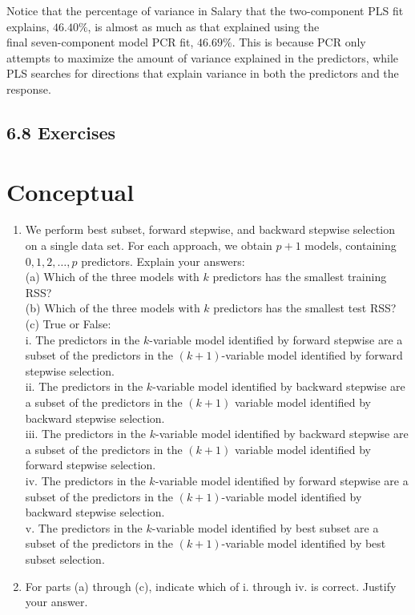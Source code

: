 \documentclass[10pt]{article}
\begin{document}
Notice that the percentage of variance in Salary that the two-component PLS fit explains, $46.40 \%$, is almost as much as that explained using the\\
final seven-component model PCR fit, $46.69 \%$. This is because PCR only attempts to maximize the amount of variance explained in the predictors, while PLS searches for directions that explain variance in both the predictors and the response.

\subsection*{6.8 Exercises}
\section*{Conceptual}
\begin{enumerate}
  \item We perform best subset, forward stepwise, and backward stepwise selection on a single data set. For each approach, we obtain $p+1$ models, containing $0,1,2, \ldots, p$ predictors. Explain your answers:\\
(a) Which of the three models with $k$ predictors has the smallest training RSS?\\
(b) Which of the three models with $k$ predictors has the smallest test RSS?\\
(c) True or False:\\
i. The predictors in the $k$-variable model identified by forward stepwise are a subset of the predictors in the $(k+1)$-variable model identified by forward stepwise selection.\\
ii. The predictors in the $k$-variable model identified by backward stepwise are a subset of the predictors in the $(k+1)$ variable model identified by backward stepwise selection.\\
iii. The predictors in the $k$-variable model identified by backward stepwise are a subset of the predictors in the $(k+1)$ variable model identified by forward stepwise selection.\\
iv. The predictors in the $k$-variable model identified by forward stepwise are a subset of the predictors in the $(k+1)$-variable model identified by backward stepwise selection.\\
v. The predictors in the $k$-variable model identified by best subset are a subset of the predictors in the $(k+1)$-variable model identified by best subset selection.
  \item For parts (a) through (c), indicate which of i. through iv. is correct. Justify your answer.\\

\end{enumerate}
\end{document}
